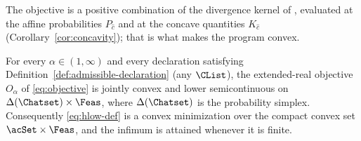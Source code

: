 
The objective is a positive combination of the divergence kernel of
, evaluated at the affine probabilities $P_{\hat c}$
and at the concave quantities $K_{\hat c}$ (Corollary~\ref{cor:concavity});
that is what makes the program convex.

\begin{theorem}\label{thm:convexity}
For every $\alpha\in(1,\infty)$ and every declaration satisfying
Definition~\ref{def:admissible-declaration} (any $\CList$), the extended-real objective
$O_{\alpha}$ of \eqref{eq:objective} is jointly convex and lower
semicontinuous on $\Delta(\Chatset)\times\Feas$, where $\Delta(\Chatset)$
is the probability simplex. Consequently \eqref{eq:hlow-def} is a convex
minimization over the compact convex set $\acSet\times\Feas$, and the
infimum is attained whenever it is finite.
\end{theorem}

